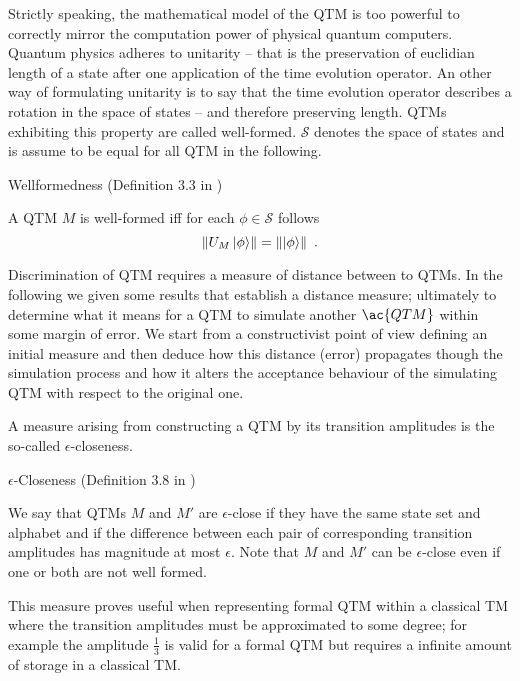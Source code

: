 Strictly speaking, the mathematical model of the \ac{QTM} is too powerful to correctly mirror the computation power of physical quantum computers.
Quantum physics adheres to unitarity -- that is the preservation of euclidian length of a state after one application of the time evolution operator.
An other way of formulating unitarity is to say that the time evolution operator describes a rotation in the space of states -- and therefore preserving length.
\acp{QTM} exhibiting this property are called well-formed.
$\mathcal{S}$ denotes the space of states and is assume to be equal for all \ac{QTM} in the following.
\begin{definition}
Wellformedness (Definition 3.3 in \cite{bernstein_vazirani_1997})

A \ac{QTM} $M$ is well-formed iff for each $\phi\in\mathcal{S}$ follows
\begin{equation*}
    \left\lVert U_M\ket{\phi}\right\rVert=\left\lVert\ket{\phi}\right\rVert
    \ .
\end{equation*}
\end{definition}

Discrimination of \ac{QTM} requires a measure of distance between to \acp{QTM}.
In the following we given some results that establish a distance measure; ultimately to determine what it means for a \ac{QTM} to simulate another $\ac{QTM}$ within some margin of error.
We start from a constructivist point of view defining an initial measure and then deduce how this distance (error) propagates though the simulation process and how it alters the acceptance behaviour of the simulating \ac{QTM} with respect to the original one.

A measure arising from constructing a \ac{QTM} by its transition amplitudes is the so-called $\epsilon$-closeness.
\begin{definition}
$\epsilon$-Closeness (Definition 3.8 in \cite{bernstein_vazirani_1997})

We say that \acp{QTM} $M$ and $M'$ are $\epsilon$-close if they have the same state set and alphabet and if the difference between each pair of corresponding transition amplitudes has magnitude at most $\epsilon$.
Note that $M$ and $M'$ can be $\epsilon$-close even if one or both are not well formed.
\end{definition}
This measure proves useful when representing formal \ac{QTM} within a classical \ac{TM} where the transition amplitudes must be approximated to some degree; for example the amplitude $\frac{1}{3}$ is valid for a formal \ac{QTM} but requires a infinite amount of storage in a classical \ac{TM}.

